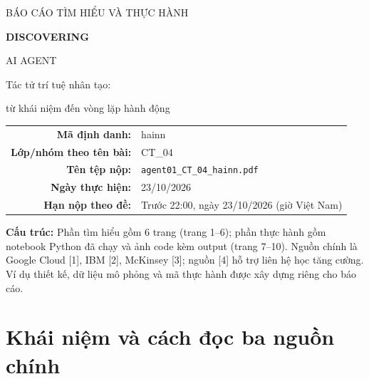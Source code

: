 \documentclass[11pt,a4paper]{article}
\begin{document}
\begin{titlepage}
\centering
\vspace*{2.3cm}
{\large\sffamily BÁO CÁO TÌM HIỂU VÀ THỰC HÀNH\par}
\vspace{1.0cm}
{\Huge\bfseries\color{ink} DISCOVERING\par AI AGENT\par}
\vspace{0.6cm}
{\Large Tác tử trí tuệ nhân tạo:\par từ khái niệm đến vòng lặp hành động\par}
\vspace{1.5cm}
\vfill
\begin{tabular}{rl}
\textbf{Mã định danh:}&hainn\\[5pt]
\textbf{Lớp/nhóm theo tên bài:}&CT\_04\\[5pt]
\textbf{Tên tệp nộp:}&\texttt{agent01\_CT\_04\_hainn.pdf}\\[5pt]
\textbf{Ngày thực hiện:}&23/10/2026\\[5pt]
\textbf{Hạn nộp theo đề:}&Trước 22:00, ngày 23/10/2026 (giờ Việt Nam)
\end{tabular}
\vspace{1.0cm}

\begin{minipage}{0.9\linewidth}\small
\textbf{Cấu trúc:} Phần tìm hiểu gồm 6 trang (trang 1--6); phần thực hành
gồm notebook Python đã chạy và ảnh code kèm output (trang 7--10).
Nguồn chính là Google Cloud [1], IBM [2], McKinsey [3]; nguồn [4] hỗ trợ liên hệ học tăng cường.
Ví dụ thiết kế, dữ liệu mô phỏng và mã thực hành được xây dựng riêng cho báo cáo.
\end{minipage}
\end{titlepage}
\setcounter{page}{1}

\section{Khái niệm và cách đọc ba nguồn chính}
\end{document}
